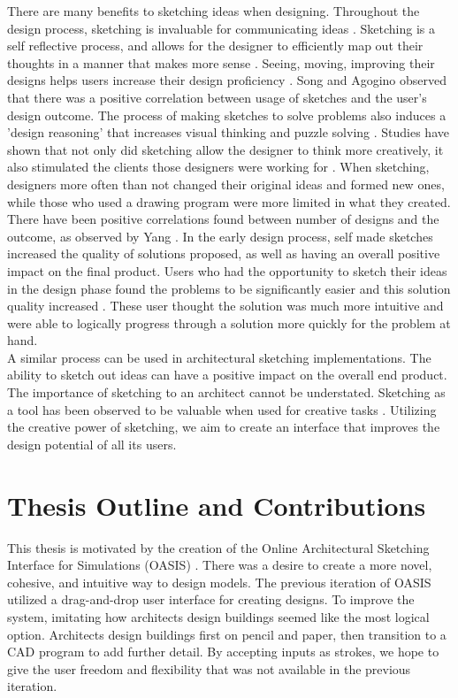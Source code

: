 There are many benefits to sketching ideas when designing. Throughout the design process, sketching is invaluable for communicating ideas \cite{ullmanwood1990}. Sketching is a self reflective process, and allows for the designer to efficiently map out their thoughts in a manner that makes more sense \cite{howdesignersthink}. Seeing, moving, improving their designs helps users increase their design proficiency \cite{schon2004}. Song and Agogino \cite{song2004} observed that there was a positive correlation between usage of sketches and the user's design outcome. The process of making sketches to solve problems also induces a 'design reasoning' that increases visual thinking and puzzle solving \cite{dialects}. Studies have shown that not only did sketching allow the designer to think more creatively, it also stimulated the clients those designers were working for \cite{Schutze2003}.  When sketching, designers more often than not changed their original ideas and formed new ones, while those who used a drawing program were more limited in what they created. There have been positive correlations found between number of designs and the outcome, as observed by Yang \cite{yang2009}. In the early design process, self made sketches increased the quality of solutions proposed, as well as having an overall positive impact on the final product. Users who had the opportunity to sketch their ideas in the design phase found the problems to be significantly easier and this solution quality increased \cite{Schutze2003}. These user thought the solution was much more intuitive and were able to logically progress through a solution more quickly for the problem at hand. \\

A similar process can be used in architectural sketching implementations. The ability to sketch out ideas can have a positive impact on the overall end product. The importance of sketching to an architect cannot be understated. Sketching as a tool has been observed to be valuable when used for creative tasks \cite{Schutze2003}. Utilizing the creative power of sketching, we aim to create an interface that improves the design potential of all its users.

\section{Thesis Outline and Contributions}

This thesis is motivated by the creation of the Online Architectural Sketching Interface for Simulations (OASIS) \cite{oasis2016}. There was a desire to create a more novel, cohesive, and intuitive way to design models. The previous iteration of OASIS utilized a drag-and-drop user interface for creating designs. To improve the system, imitating how architects design buildings seemed like the most logical option. Architects design buildings first on pencil and paper, then transition to a CAD program to add further detail. By accepting inputs as strokes, we hope to give the user freedom and flexibility that was not available in the previous iteration. \\


